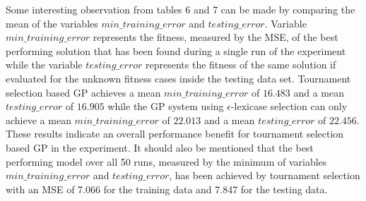 \documentclass[
  12pt,
]{article}
\begin{document}
\begin{table}[!h]

\caption{\label{tab:unnamed-chunk-7}Summary - Epsilon-Lexicase Selection}
\centering
{}
\end{table}

Some interesting observation from tables 6 and 7 can be made by
comparing the mean of the variables \(min\_training\_error\) and
\(testing\_error\). Variable \(min\_training\_error\) represents the
fitness, measured by the MSE, of the best performing solution that has
been found during a single run of the experiment while the variable
\(testing\_error\) represents the fitness of the same solution if
evaluated for the unknown fitness cases inside the testing data set.
Tournament selection based GP achieves a mean \(min\_training\_error\)
of \(16.483\) and a mean \(testing\_error\) of \(16.905\) while the GP
system using \(\epsilon\)-lexicase selection can only achieve a mean
\(min\_training\_error\) of \(22.013\) and a mean \(testing\_error\) of
\(22.456\). These results indicate an overall performance benefit for
tournament selection based GP in the experiment. It should also be
mentioned that the best performing model over all 50 runs, measured by
the minimum of variables \(min\_training\_error\) and
\(testing\_error\), has been achieved by tournament selection with an
MSE of 7.066 for the training data and 7.847 for the testing data.
\end{document}
